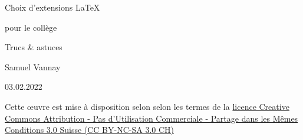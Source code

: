 
\begin{titlepage}
	\begin{center}
		\vspace*{3cm}
		
		\Huge{
			Choix d'extensions \LaTeX
			
			pour le collège
		}

		\vspace*{3cm}
		
		\Huge{
			Trucs \& astuces
		}
		
		\vspace{12cm}
		
		\small{
			Samuel Vannay
			
			03.02.2022
			
			\ccLogo \ccAttribution \ccNonCommercialEU \ccShareAlike
		}
	\end{center}

\end{titlepage}
 






\tableofcontents

\vfill

Cette {\oe}uvre est mise à disposition selon selon les termes de la \href{http://creativecommons.org/licenses/by-nc-sa/3.0/ch/deed.fr}{licence Creative Commons Attribution - Pas d'Utilisation Commerciale - Partage dans les Mêmes Conditions 3.0 Suisse (CC BY-NC-SA 3.0 CH)}